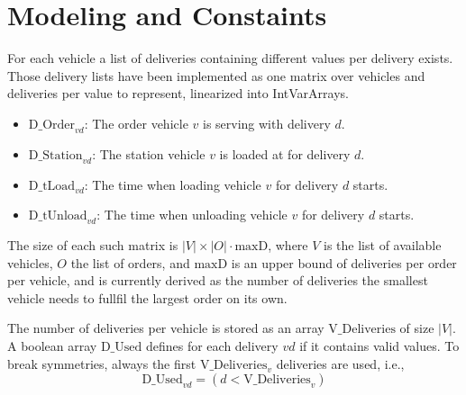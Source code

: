 \documentclass[a4paper]{article}
\begin{document}
\section{Modeling and Constaints}

For each vehicle a list of deliveries containing different values per delivery exists. Those delivery lists have been implemented
as one matrix over vehicles and deliveries per value to represent, linearized into IntVarArrays.

\newcommand{\DOrder}{\text{D\_Order}}
\newcommand{\DStation}{\text{D\_Station}}
\newcommand{\DtLoad}{\text{D\_tLoad}}
\newcommand{\SdtLoad}{\text{S\_dTLoad}}
\newcommand{\DtUnload}{\text{D\_tUnload}}
\newcommand{\maxD}{\text{maxD}}
\newcommand{\VDeliveries}{\text{V\_Deliveries}}
\newcommand{\ODeliveries}{\text{O\_Deliveries}}
\newcommand{\DUsed}{\text{D\_Used}}
\newcommand{\DdTtravelTo}{\text{D\_dTTravelTo}}
\newcommand{\DdTtravelFrom}{\text{D\_dTTravelFrom}}
\newcommand{\DtArrival}{\text{D\_tArrival}}
\newcommand{\DDelivered}{\text{D\_Delivered}}
\newcommand{\DdTUnloading}{\text{D\_dTUnloading}}
\newcommand{\DPoured}{\text{D\_Poured}}
\newcommand{\OPoured}{\text{O\_Poured}}
\newcommand{\OReqDischargeRate}{\text{O\_ReqDischargeRate}}
\newcommand{\Tmax}{T_\text{max}}
\newcommand{\OstartTime}{\text{O\_startTime}}


\begin{itemize}
\item $\DOrder_{vd}$: The order vehicle $v$ is serving with delivery $d$.
\item $\DStation_{vd}$: The station vehicle $v$ is loaded at for delivery $d$.
\item $\DtLoad_{vd}$: The time when loading vehicle $v$ for delivery $d$ starts.
\item $\DtUnload_{vd}$: The time when unloading vehicle $v$ for delivery $d$ starts.
\end{itemize}

The size of each such matrix is $|V| \times |O| \cdot \maxD$, where $V$ is the list of available vehicles, $O$ the list of
orders, and $\maxD$ is an upper bound of deliveries per order per vehicle, and is currently derived as the number of
deliveries the smallest vehicle needs to fullfil the largest order on its own.

The number of deliveries per vehicle is stored as an array $\VDeliveries$ of size $|V|$. A boolean array $\DUsed$
defines for each delivery $vd$ if it contains valid values. To break symmetries, always the first $\VDeliveries_v$
deliveries are used, i.e.,
\[
  \DUsed_{vd} = (d < \VDeliveries_v)
\]
\end{document}
